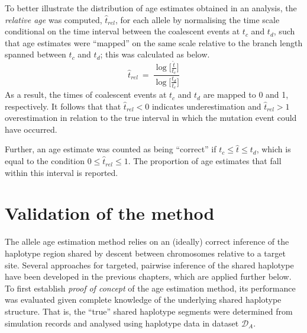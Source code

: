 To better illustrate the distribution of age estimates obtained in an analysis, the \emph{relative age} was computed, $\hat{t}_\textit{rel}$, for each allele by normalising the time scale conditional on the time interval between the coalescent events at $t_c$ and $t_d$, such that age estimates were ``mapped'' on the same scale relative to the branch length spanned between $t_c$ and $t_d$; this was calculated as below.
\begin{equation}\label{eq:age_relative}
	\hat{t}_\textit{rel} ~=~
	\frac{ \log \big[ \frac{\hat{t}}{t_c} \big] }{ \log \big[ \frac{t_d}{t_c} \big] }
\end{equation}
As a result, the times of coalescent events at $t_c$ and $t_d$ are mapped to 0 and 1, respectively.
It follows that that ${\hat{t}_\textit{rel} < 0}$ indicates underestimation and ${\hat{t}_\textit{rel} > 1}$ overestimation in relation to the true interval in which the mutation event could have occurred.

Further, an age estimate was counted as being ``correct'' if ${t_c \leq \hat{t} \leq t_d}$, which is equal to the condition ${0 \leq \hat{t}_\textit{rel} \leq 1}$.
The proportion of age estimates that fall within this interval is reported.











%
\section{Validation of the method}\label{sec:age_validation_analysis}
%


The allele age estimation method relies on an (ideally) correct inference of the haplotype region shared by descent between  chromosomes relative to a target site.
Several approaches for targeted, pairwise inference of the shared haplotype have been developed in the previous chapters, which are applied further below.
To first establish \emph{proof of concept} of the age estimation method, its performance was evaluated given complete knowledge of the underlying shared haplotype structure.
That is, the ``true'' shared haplotype segments were determined from simulation records and analysed using haplotype data in dataset $\mathcal{D}_A$.

